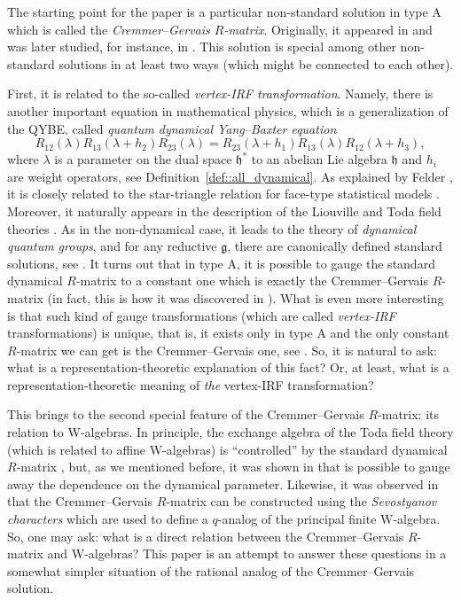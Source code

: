 \documentclass[pdftex]{sigma}
\numberwithin{equation}{section}
\newcommand{\g}{\mathfrak{g}}
\newcommand{\h}{\mathfrak{h}}
\begin{document}
The starting point for the paper is a particular non-standard solution in type A which is called the \emph{Cremmer--Gervais $R$-matrix}. Originally, it appeared in \cite{CremmerGervais} and was later studied, for instance, in \cite{BuffenoirRocheTerras,Hodges}. This solution is special among other non-standard solutions in at least two ways (which might be connected to each other).
	
First, it is related to the so-called \emph{vertex-IRF transformation}. Namely, there is another important equation in mathematical physics, which is a generalization of the QYBE, called \emph{quantum dynamical Yang--Baxter equation}
	\[
	R_{12}(\lambda) R_{13}(\lambda+h_2) R_{23} (\lambda)= R_{23}(\lambda + h_1) R_{13}(\lambda) R_{12}(\lambda + h_3),
	\]
	where $\lambda$ is a parameter on the dual space $\h^*$ to an abelian Lie algebra $\h$ and $h_i$ are weight operators, see Definition~\ref{def::all_dynamical}. As explained by Felder \cite{Felder}, it is closely related to the star-triangle relation for face-type statistical models \cite{Baxter}. Moreover, it naturally appears in the description of the Liouville and Toda field theories \cite{GervaisNeveu}. As in the non-dynamical case, it leads to the theory of \emph{dynamical quantum groups}, and for any reductive $\g$, there are canonically defined standard solutions, see \cite{EtingofICM,EtingofSchiffmann}. It turns out that in type A, it is possible to gauge the standard dynamical $R$-matrix to a constant one which is exactly the Cremmer--Gervais $R$-matrix (in fact, this is how it was discovered in \cite{CremmerGervais}). What is even more interesting is that such kind of gauge transformations (which are called \emph{vertex-IRF} transformations) is unique, that is, it exists only in type A and the only constant $R$-matrix we can get is the Cremmer--Gervais one, see \cite{BalogDabrowskiFeher}. So, it is natural to ask: what is a representation-theoretic explanation of this fact? Or, at least, what is a representation-theoretic meaning of \emph{the} vertex-IRF transformation?
	
	This brings to the second special feature of the Cremmer--Gervais $R$-matrix: its relation to W-algebras. In principle, the exchange algebra of the Toda field theory (which is related to affine W-algebras) is ``controlled'' by the standard dynamical $R$-matrix \cite{GervaisNeveu}, but, as we mentioned before, it was shown in \cite{CremmerGervais} that is possible to gauge away the dependence on the dynamical parameter. Likewise, it was observed in \cite{BuffenoirRocheTerrasAffine} that the Cremmer--Gervais $R$-matrix can be constructed using the \emph{Sevostyanov characters} \cite{SevostyanovWhittakerModules} which are used to define a $q$-analog of the principal finite W-algebra. So, one may ask: what is a direct relation between the Cremmer--Gervais $R$-matrix and W-algebras? This paper is an attempt to answer these questions in a somewhat simpler situation of the rational analog of the Cremmer--Gervais solution.
	
\end{document}
